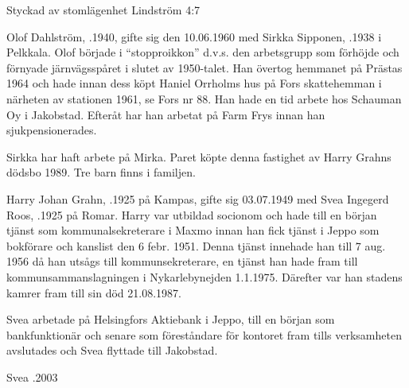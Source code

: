 
Styckad av stomlägenhet Lindström 4:7


Olof Dahlström, .1940, gifte sig den 10.06.1960 med Sirkka Sipponen, .1938 i Pelkkala. Olof började i ``stopproikkon'' d.v.s. den arbetsgrupp som förhöjde och förnyade järnvägsspåret i slutet av 1950-talet. Han övertog hemmanet på Prästas 1964 och hade innan dess köpt Haniel Orrholms hus på Fors skattehemman i närheten av stationen 1961, se Fors nr 88. Han hade en tid arbete hos Schauman Oy i Jakobstad. Efteråt har han arbetat på Farm Frys innan han sjukpensionerades.

Sirkka har haft arbete på Mirka. Paret köpte denna fastighet av Harry Grahns dödsbo 1989. Tre barn finns i familjen.
\begin{jhchildren}
  \item {}
  \item {}
  \item {}
\end{jhchildren}


Harry Johan Grahn, .1925 på Kampas, gifte sig 03.07.1949 med Svea Ingegerd Roos, .1925 på Romar. Harry var utbildad socionom och hade till en början tjänst som kommunalsekreterare i Maxmo innan han fick tjänst i Jeppo som bokförare och kanslist den 6 febr. 1951. Denna tjänst innehade han till 7 aug. 1956 då han utsågs till kommunsekreterare, en tjänst han hade fram till kommunsammanslagningen i Nykarlebynejden 1.1.1975. Därefter var han stadens kamrer fram till sin död 21.08.1987.

Svea arbetade på Helsingfors Aktiebank i Jeppo, till en början som bankfunktionär och senare som föreståndare för kontoret fram tills verksamheten avslutades och Svea flyttade till Jakobstad.
\begin{jhchildren}
  \item {}
  \item {}
  \item {}
\end{jhchildren}
Svea .2003




